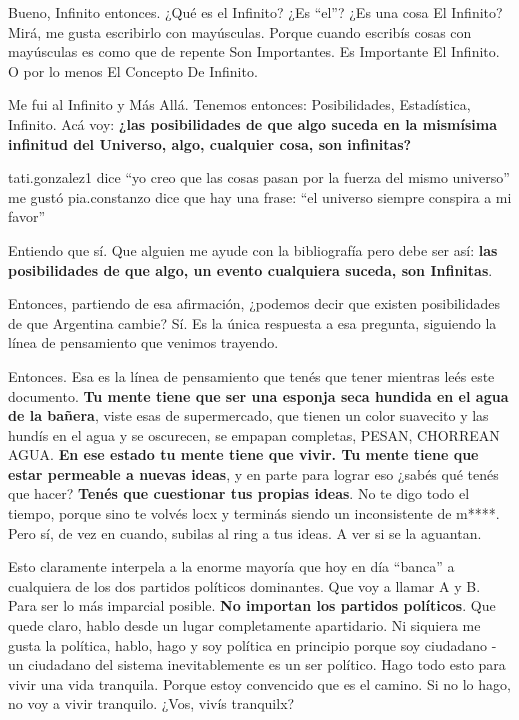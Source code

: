 \documentclass[
]{book}
\begin{document}
Bueno, Infinito entonces. ¿Qué es el Infinito? ¿Es ``el''? ¿Es una cosa El Infinito? Mirá, me gusta escribirlo con mayúsculas. Porque cuando escribís cosas con mayúsculas es como que de repente Son Importantes. Es Importante El Infinito. O por lo menos El Concepto De Infinito.

Me fui al Infinito y Más Allá. Tenemos entonces: Posibilidades, Estadística, Infinito. Acá voy: \textbf{¿las posibilidades de que algo suceda en la mismísima infinitud del Universo, algo, cualquier cosa, son infinitas?}

tati.gonzalez1 dice ``yo creo que las cosas pasan por la fuerza del mismo universo'' me gustó
pia.constanzo dice que hay una frase: ``el universo siempre conspira a mi favor''

Entiendo que sí. Que alguien me ayude con la bibliografía pero debe ser así: \textbf{las posibilidades de que algo, un evento cualquiera suceda, son Infinitas}.

Entonces, partiendo de esa afirmación, ¿podemos decir que existen posibilidades de que Argentina cambie? Sí. Es la única respuesta a esa pregunta, siguiendo la línea de pensamiento que venimos trayendo.

Entonces. Esa es la línea de pensamiento que tenés que tener mientras leés este documento. \textbf{Tu mente tiene que ser una esponja seca hundida en el agua de la bañera}, viste esas de supermercado, que tienen un color suavecito y las hundís en el agua y se oscurecen, se empapan completas, PESAN, CHORREAN AGUA. \textbf{En ese estado tu mente tiene que vivir. Tu mente tiene que estar permeable a nuevas ideas}, y en parte para lograr eso ¿sabés qué tenés que hacer? \textbf{Tenés que cuestionar tus propias ideas}. No te digo todo el tiempo, porque sino te volvés locx y terminás siendo un inconsistente de m****. Pero sí, de vez en cuando, subilas al ring a tus ideas. A ver si se la aguantan.

Esto claramente interpela a la enorme mayoría que hoy en día ``banca'' a cualquiera de los dos partidos políticos dominantes. Que voy a llamar A y B. Para ser lo más imparcial posible. \textbf{No importan los partidos políticos}. Que quede claro, hablo desde un lugar completamente apartidario. Ni siquiera me gusta la política, hablo, hago y soy política en principio porque soy ciudadano - un ciudadano del sistema inevitablemente es un ser político. Hago todo esto para vivir una vida tranquila. Porque estoy convencido que es el camino. Si no lo hago, no voy a vivir tranquilo. ¿Vos, vivís tranquilx?
\end{document}
